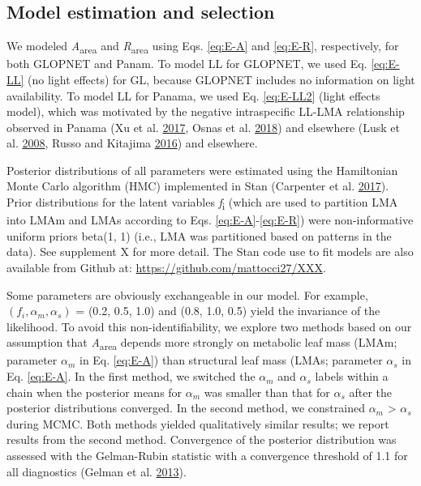 \documentclass[
  12pt,
]{article}
\begin{document}
\hypertarget{model-estimation-and-selection}{%
\subsection{Model estimation and selection}\label{model-estimation-and-selection}}

We modeled \emph{A}\textsubscript{area} and \emph{R}\textsubscript{area} using Eqs. \eqref{eq:E-A} and \eqref{eq:E-R}, respectively, for both GLOPNET and Panam.
To model LL for GLOPNET, we used Eq. \eqref{eq:E-LL} (no light effects) for GL, because GLOPNET includes no information on light availability.
To model LL for Panama, we used Eq. \eqref{eq:E-LL2} (light effects model), which was motivated by the negative intraspecific LL-LMA relationship observed in Panama (Xu et al. \protect\hyperlink{ref-Xu2017}{2017}, Osnas et al. \protect\hyperlink{ref-Osnas2018}{2018}) and elsewhere (Lusk et al. \protect\hyperlink{ref-Lusk2008}{2008}, Russo and Kitajima \protect\hyperlink{ref-Russo2016}{2016}) and elsewhere.

Posterior distributions of all parameters were estimated using the Hamiltonian Monte Carlo algorithm (HMC) implemented in Stan (Carpenter et al. \protect\hyperlink{ref-Carpenter2017}{2017}).
Prior distributions for the latent variables \emph{f}\textsubscript{i} (which are used to partition LMA into LMAm and LMAs according to Eqs. \eqref{eq:E-A}-\eqref{eq:E-R}) were non-informative uniform priors beta(1, 1) (i.e., LMA was partitioned based on patterns in the data). See supplement X for more detail.
The Stan code use to fit models are also available from Github at: \href{https://github.com/mattocci27/LMAmLMAs}{https://github.com/mattocci27/XXX}.

Some parameters are obviously exchangeable in our model.
For example, \((f_i, \alpha_m, \alpha_s)\) = (0.2, 0.5, 1.0) and (0.8, 1.0, 0.5) yield the invariance of the likelihood.
To avoid this non-identifiability, we explore two methods based on our assumption that \emph{A}\textsubscript{area} depends more strongly on metabolic leaf mass (LMAm; parameter \(\alpha_m\) in Eq. \eqref{eq:E-A}) than structural leaf mass (LMAs; parameter \(\alpha_s\) in Eq. \eqref{eq:E-A}.
In the first method, we switched the \(\alpha_m\) and \(\alpha_s\) labels within a chain when the posterior means for \(\alpha_m\) was smaller than that for \(\alpha_s\) after the posterior distributions converged.
In the second method, we constrained \(\alpha_m\) \textgreater{} \(\alpha_s\) during MCMC.
Both methods yielded qualitatively similar results; we report results from the second method.
Convergence of the posterior distribution was assessed with the Gelman-Rubin statistic with a convergence threshold of 1.1 for all diagnostics (Gelman et al. \protect\hyperlink{ref-Gelman2013}{2013}).
\end{document}
